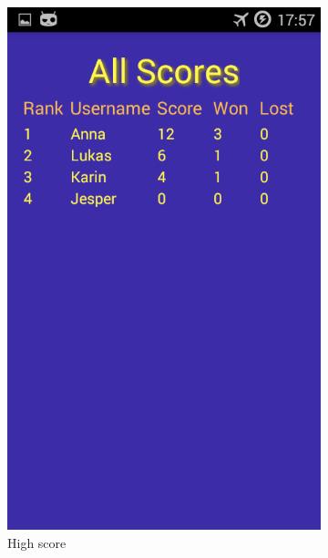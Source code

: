 \begin{figure}[ht]
    \centering
   \begin{subfigure}[b]{0.3\textwidth}
        \includegraphics[width=\textwidth]{./img/bruksanvisning/12.png}
        \caption{High score}
        \label{fig:aktivitet_score}
    \end{subfigure}
    \begin{subfigure}[b]{0.3\textwidth}

\end{subfigure}
\end{figure}
